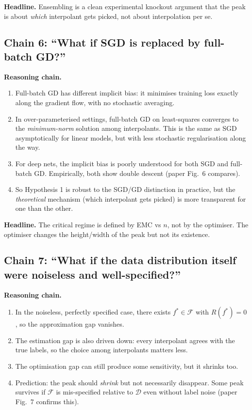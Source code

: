 \documentclass[11pt,a4paper]{article}
\newcommand{\D}{\mathcal{D}}
\newcommand{\F}{\mathcal{F}}
\theoremstyle{definition}
\begin{document}
\textbf{Headline.} Ensembling is a clean experimental knockout argument that the peak is about \emph{which} interpolant gets picked, not about interpolation per se.

\subsection{Chain 6: ``What if SGD is replaced by full-batch GD?''}

\textbf{Reasoning chain.}
\begin{enumerate}[leftmargin=1.4em]
\item Full-batch GD has different implicit bias: it minimises training loss exactly along the gradient flow, with no stochastic averaging.
\item In over-parameterised settings, full-batch GD on least-squares converges to the \emph{minimum-norm} solution among interpolants. This is the same as SGD asymptotically for linear models, but with less stochastic regularisation along the way.
\item For deep nets, the implicit bias is poorly understood for both SGD and full-batch GD. Empirically, both show double descent (paper Fig.\ 6 compares).
\item So Hypothesis 1 is robust to the SGD/GD distinction in practice, but the \emph{theoretical} mechanism (which interpolant gets picked) is more transparent for one than the other.
\end{enumerate}

\textbf{Headline.} The critical regime is defined by EMC vs $n$, not by the optimiser. The optimiser changes the height/width of the peak but not its existence.

\subsection{Chain 7: ``What if the data distribution itself were noiseless and well-specified?''}

\textbf{Reasoning chain.}
\begin{enumerate}[leftmargin=1.4em]
\item In the noiseless, perfectly specified case, there exists $f^{*}\in\F$ with $R(f^{*})=0$, so the approximation gap vanishes.
\item The estimation gap is also driven down: every interpolant agrees with the true labels, so the choice among interpolants matters less.
\item The optimisation gap can still produce some sensitivity, but it shrinks too.
\item Prediction: the peak should \emph{shrink} but not necessarily disappear. Some peak survives if $\F$ is mis-specified relative to $\D$ even without label noise (paper Fig.\ 7 confirms this).
\end{enumerate}
\end{document}
